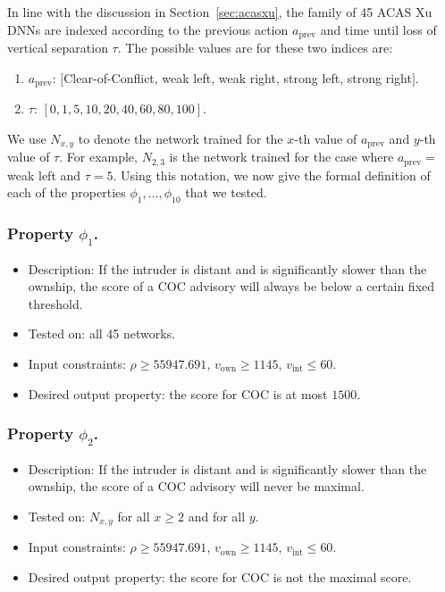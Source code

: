 \documentclass[a4paper]{llncs}
\begin{document}
In line with the discussion in Section~\ref{sec:acasxu}, the family of 45 ACAS Xu
DNNs are indexed according to the previous action $a_\text{prev}$ and
time until loss of vertical separation $\tau$. The possible values are
for these two indices are:

\begin{enumerate}
\item $a_\text{prev}$: $[$Clear-of-Conflict, weak left, weak right,
  strong left, strong right$]$.
\item $\tau$: $[0,1,5,10,20,40,60,80,100]$.
\end{enumerate}

We use $N_{x,y}$ to denote the network trained for the
$x$-th value of $a_\text{prev}$ and $y$-th value of $\tau$. For
example, $N_{2,3}$ is the network trained for the case where
$a_\text{prev}=$  weak left
and
 $\tau=5$.
Using this notation, we now give the formal definition of each of the
properties $\phi_1,\ldots,\phi_{10}$ that we tested.

\subsubsection{Property $\phi_1$.}
\begin{itemize}
\item Description:
  If the intruder is distant and is
  significantly slower than the ownship, the score of a COC advisory will
  always be below a certain fixed threshold.
\item Tested on: all 45 networks.
\item Input constraints:
  $\rho\geq 55947.691$,
  $v_\text{own}\geq 1145$,
  $v_\text{int}\leq 60$.
\item Desired output property: the score for COC is at most $1500$.
\end{itemize}

\subsubsection{Property $\phi_2$.}
\begin{itemize}
\item Description:
  If the intruder is distant and is
  significantly slower than the ownship, the score of a COC advisory will
  never be maximal.
\item Tested on: $N_{x,y}$ for all $x\geq 2$ and for all $y$.
\item Input constraints:
  $\rho\geq 55947.691$,
  $v_\text{own}\geq 1145$,
  $v_\text{int}\leq 60$.
\item Desired output property: the score for COC is not the maximal score.
\end{itemize}
\end{document}
